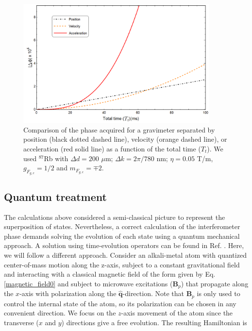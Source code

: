 \documentclass{article}
\begin{document}
\begin{figure}
\centering
\includegraphics[width=0.9\textwidth]{comparacion_fase_posicion__velocidad_aceleracion.png}
\caption{Comparison of the phase acquired for a gravimeter separated by position (black dotted dashed line), velocity (orange dashed line), or acceleration (red solid line) as a function of the total time ($T_t$). We used $^{87}$Rb with $\Delta d = 200$ $\mu$m; $\Delta k = 2\pi /780$ nm; $\eta=0.05$ T/m, $g_{F_{g, e}} = 1/2$ and $m_{F_{g, e}} = \mp 2$.}
\label{phase_graph0}
\end{figure}

\subsection{Quantum treatment}

The calculations above considered a semi-classical picture to represent the superposition of states. Nevertheless, a correct calculation of the interferometer phase demands solving the evolution of each state using a quantum mechanical approach. A solution using time-evolution operators can be found in Ref. \cite{Zimmermann2017}. Here, we will follow a different approach. Consider an alkali-metal atom with quantized center-of-mass motion along the z-axis, subject to a constant gravitational field and interacting with a classical magnetic field of the form given by Eq. \ref{magnetic_field0} and subject to microwave excitations ($\textbf{B}_p$) that propagate along the $x$-axis with polarization along the $\hat{\textbf{q}}$-direction. Note that $\textbf{B}_p$ is only used to control the internal state of the atom, so its polarization can be chosen in any convenient direction. We focus on the $z$-axis movement of the atom since the transverse ($x$ and $y$) directions give a free evolution. The resulting Hamiltonian is \cite{Castanos2014}
\end{document}
